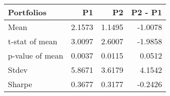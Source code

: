 \begin{tabular}{lrrr}
\toprule
Portfolios & P1 & P2 & P2 - P1 \\
\midrule
Mean & 2.1573 & 1.1495 & -1.0078 \\
t-stat of mean & 3.0097 & 2.6007 & -1.9858 \\
p-value of mean & 0.0037 & 0.0115 & 0.0512 \\
Stdev & 5.8671 & 3.6179 & 4.1542 \\
Sharpe & 0.3677 & 0.3177 & -0.2426 \\
\bottomrule
\end{tabular}
